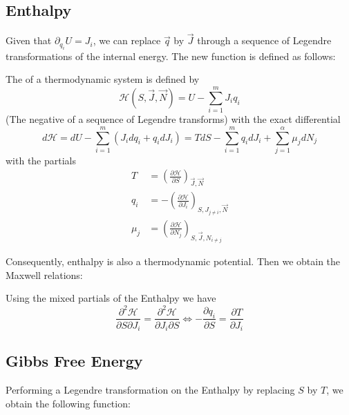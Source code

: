 \documentclass[12pt, a4paper, oneside, openright, titlepage]{book}
\begin{document}
\subsection{Enthalpy}

Given that $\partial_{q_i}U = J_i$, we can replace $\vec{q}$ by $\vec{J}$ through a sequence of Legendre transformations of the internal energy. The new function is defined as follows:
\begin{defn}
    The  of a thermodynamic system is defined by \begin{equation*}
        \mathcal{H}(S,\vec{J},\vec{N}) = U - \sum_{i=1}^mJ_iq_i
    \end{equation*}
    (The negative of a sequence of Legendre transforms) with the exact differential \begin{equation*}
        d\mathcal{H} = dU - \sum_{i=1}^m(J_idq_i + q_idJ_i) = TdS - \sum_{i=1}^mq_idJ_i + \sum_{j=1}^{\alpha}\mu_jdN_j
    \end{equation*}
    with the partials \begin{align*}
        T &= \left(\frac{\partial \mathcal{H}}{\partial S}\right)_{\vec{J},\vec{N}}  \\
        q_i &= -\left(\frac{\partial \mathcal{H}}{\partial J_i}\right)_{S,J_{j\neq i},\vec{N}} \\
        \mu_j &= \left(\frac{\partial \mathcal{H}}{\partial N_j}\right)_{S,\vec{J},N_{i\neq j}} 
    \end{align*}
\end{defn}

Consequently, enthalpy is also a thermodynamic potential. Then we obtain the Maxwell relations:

\begin{prop}
    Using the mixed partials of the Enthalpy we have \begin{equation*}
        \frac{\partial^2\mathcal{H}}{\partial S\partial J_i} = \frac{\partial^2\mathcal{H}}{\partial J_i\partial S}\iff -\frac{\partial q_i}{\partial S} = \frac{\partial T}{\partial J_i}
    \end{equation*}
\end{prop}

\subsection{Gibbs Free Energy}

Performing a Legendre transformation on the Enthalpy by replacing $S$ by $T$, we obtain the following function:
\end{document}
